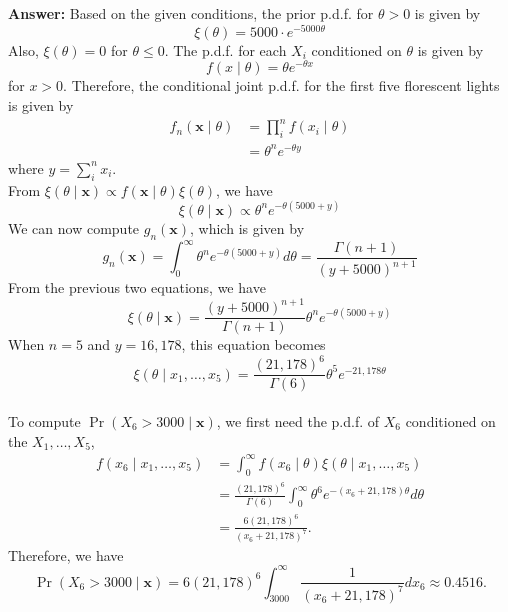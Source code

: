 \documentclass{article}
\begin{document}
\textbf{Answer:} Based on the given conditions, the prior p.d.f. for $\theta > 0$ is given by
\begin{equation*}
\xi (\theta) = 5000 \cdot e^{-5000 \theta}
\end{equation*}
Also, $\xi (\theta) = 0$ for $\theta \le 0$. The p.d.f. for each $X_i$ conditioned on $\theta$ is given by 
\begin{equation*}
f(x \mid \theta) = \theta e^{-\theta x}
\end{equation*}
for $x > 0$. Therefore, the conditional joint p.d.f. for the first five florescent lights is given by
\begin{align*}
f_n(\boldsymbol{x} \mid \theta) &= \prod_i^n f(x_i \mid \theta) \\
&= \theta^n e^{-\theta y}
\end{align*}
where $y = \sum_i^n x_i$.\\
From $\xi(\theta \mid \boldsymbol{x}) \propto f(\boldsymbol{x} \mid \theta) \xi(\theta)$, we have
\begin{equation*}
\xi(\theta \mid \boldsymbol{x}) \propto \theta^n e^{-\theta(5000+y)}
\end{equation*}
We can now compute $g_n(\boldsymbol{x})$, which is given by
\begin{equation*}
g_n(\boldsymbol{x}) = \int_{0}^{\infty} \theta^n e^{-\theta(5000+y)} d \theta = \frac{\Gamma(n + 1)}{(y + 5000)^{n+1}}
\end{equation*}
From the previous two equations, we have
\begin{equation*}
\xi(\theta \mid \boldsymbol{x}) = \frac{(y + 5000)^{n+1}}{\Gamma(n + 1)} \theta^n e^{-\theta(5000+y)}
\end{equation*}
When $n = 5$ and $y = 16,178$, this equation becomes
\begin{equation*}
\xi(\theta \mid x_1,\dots,x_5) = \frac{(21,178)^{6}}{\Gamma(6)} \theta^5 e^{-21,178\theta}
\end{equation*}\\
To compute $\Pr(X_6 > 3000 \mid \boldsymbol{x})$, we first need the p.d.f. of $X_6$ conditioned on the $X_1, \dots, X_5$,
\begin{align*}
f(x_6 \mid x_1,\dots,x_5) &= \int_0^{\infty} f(x_6 \mid \theta) \xi(\theta \mid x_1,\dots,x_5)\\
&= \frac{(21,178)^{6}}{\Gamma(6)} \int_0^{\infty} \theta^{6} e^{-(x_6 + 21,178) \theta} d\theta \\
&= \frac{6 (21,178)^{6}}{(x_6 + 21,178)^{7}}.
\end{align*}
Therefore, we have 
\begin{equation*}
\Pr(X_6 > 3000 \mid \boldsymbol{x}) = 6 (21,178)^{6} \int_{3000}^{\infty} \frac{1}{(x_6 + 21,178)^{7}} dx_6 \approx 0.4516.
\end{equation*} 
\end{document}
